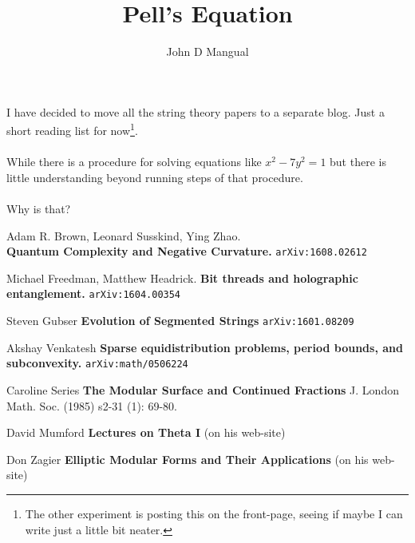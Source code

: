 \documentclass[12pt]{article}
\title{\textbf{ Pell's Equation }}
\author{John D Mangual}
\date{}
\begin{document}
\selectfont \fontsize{23}{25}\selectfont

\maketitle

\noindent I have decided to move all the string theory papers to a separate blog.  Just a short reading list for now\footnote{The other experiment is posting this on the front-page, seeing if maybe I can write just a little bit neater.}. \\ \\
While there is a procedure for solving equations like $x^2 - 7y^2 = 1$ but there is little understanding beyond running steps of that procedure. \\ \\
Why is that?



\selectfont \fontsize{12}{10}\selectfont

\begin{thebibliography}{}

\item Adam R. Brown, Leonard Susskind, Ying Zhao.  \\ \textbf{Quantum Complexity and Negative Curvature. } \texttt{arXiv:1608.02612}
	
\item  Michael Freedman, Matthew Headrick. \textbf{Bit threads and holographic entanglement.} \texttt{arXiv:1604.00354}

\item Steven Gubser \textbf{Evolution of Segmented Strings} \texttt{arXiv:1601.08209}

\item Akshay Venkatesh \textbf{ Sparse equidistribution problems, period bounds, and subconvexity.} \texttt{arXiv:math/0506224}

\item Caroline Series \textbf{The Modular Surface and Continued Fractions} J. London Math. Soc. (1985) s2-31 (1): 69-80.

\item David Mumford \textbf{Lectures on Theta I} (on his web-site)

\item Don Zagier \textbf{Elliptic Modular Forms and Their Applications} (on his web-site)

\end{thebibliography}
\end{document}
